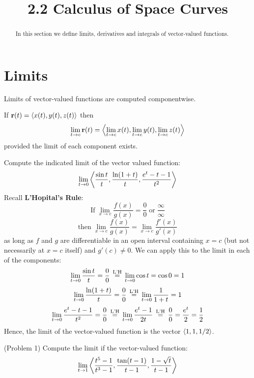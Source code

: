 \documentclass[handout]{ximera}
\title{2.2 Calculus of Space Curves}
\begin{document}
\begin{abstract}
In this section we define limits, derivatives and integrals of vector-valued functions.
\end{abstract}

\maketitle

\section{Limits}
Limits of vector-valued functions are computed componentwise. 
\begin{definition}
If $\mathbf r(t) = \left\langle x(t), y(t), z(t)\right\rangle$ then
\[
\lim_{t \to c} \mathbf r(t) = \left\langle \lim_{t \to c}x(t), \lim_{t \to c}y(t),\lim_{t \to c} z(t)\right\rangle
\]
provided the limit of each component exists.
\end{definition}

\begin{example}[Example 1]
Compute the indicated limit of the vector valued function:
\[
\lim_{t \to 0} \left\langle \frac{\sin t}{t}, \frac{\ln(1+t)}{t}, \frac{e^t - t -1}{t^2}\right\rangle
\]
Recall \textbf{L'Hopital's Rule}:
\[
\text{If}\; \lim_{x \to c} \frac{f(x)}{g(x)} = \frac00 \; \text{or} \; \frac{\infty}{\infty} 
\]
\[
\text{then} \; \lim_{x \to c} \frac{f(x)}{g(x)} = \lim_{x \to c} \frac{f'(x)}{g'(x)}
\]
as long as $f$ and $g$ are differentiable in an open interval containing $x = c$ (but not necessarily at $x = c$ itself)
and $g'(c) \neq 0$. We can apply this to the limit in each of the components:
\[
\lim_{t \to 0} \frac{\sin t}{t} = \frac00 \,\overset{\scriptsize\text{L'H}}{=}\, \lim_{t\to 0} \cos t = \cos 0  = 1
\]
\[
\lim_{t \to 0} \frac{\ln(1+t)}{t} = \frac00 \,\overset{\scriptsize\text{L'H}}{=}\, \lim_{t\to 0} \frac{1}{1+t} = 1
\]
\[
\lim_{t \to 0} \frac{e^t - t - 1}{t^2} = \frac00 \,\overset{\scriptsize\text{L'H}}{=}\, \lim_{t\to 0} \frac{e^t - 1}{2t} 
\,\overset{\scriptsize\text{L'H}}{=}\, \frac00 = \frac{e^t}{2}  = \frac12
\]
Hence, the limit of the vector-valued function is the vector $\left\langle 1, 1, 1/2\right\rangle$.
\end{example}

\begin{problem}(Problem 1)
Compute the limit if the vector-valued function:
\[
\lim_{t \to 1} \left\langle \frac{t^5 - 1}{t^3 - 1}, \frac{\tan(t-1)}{t-1}, \frac{1 - \sqrt t}{t-1}\right\rangle
\]
\end{problem}
\end{document}
